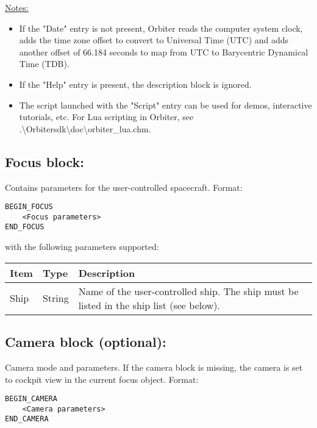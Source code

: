 \documentclass[Orbiter Developer Manual.tex]{subfiles}
\begin{document}
\noindent
\underline{Notes:}

\begin{itemize}
\item If the "Date" entry is not present, Orbiter reads the computer system clock, adds the time zone offset to convert to Universal Time (UTC) and adds another offset of 66.184 seconds to map from UTC to Barycentric Dynamical Time (TDB).
\item If the "Help" entry is present, the description block is ignored.
\item The script launched with the "Script" entry can be used for demos, interactive tutorials, etc. For Lua scripting in Orbiter, see .\textbackslash Orbitersdk\textbackslash doc\textbackslash orbiter\_lua.chm.
\end{itemize}


\subsection*{Focus block:}
Contains parameters for the user-controlled spacecraft. Format:

\begin{lstlisting}[language=OSFS]
BEGIN_FOCUS
	<Focus parameters>
END_FOCUS
\end{lstlisting}

\noindent
with the following parameters supported:

\begin{table}[H]
	\centering
	\begin{tabularx}{\textwidth}{ |l|l|X| }
	\hline\rule{0pt}{2ex}
	\textbf{Item} & \textbf{Type} & \textbf{Description}\\
	\hline\rule{0pt}{2ex}
	Ship & String & Name of the user-controlled ship. The ship must be listed in the ship list (see below).\\
	\hline
	\end{tabularx}
\end{table}

\subsection*{Camera block (optional):}

Camera mode and parameters. If the camera block is missing, the camera is set to cockpit view in the current focus object. Format:

\begin{lstlisting}[language=OSFS]
BEGIN_CAMERA
	<Camera parameters>
END_CAMERA
\end{lstlisting}
\end{document}
